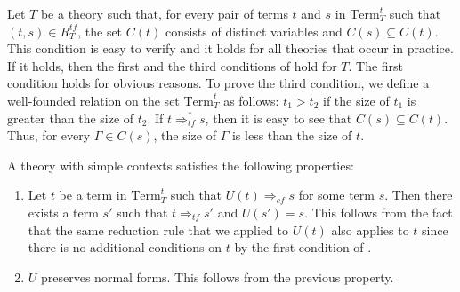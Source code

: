 \documentclass[reqno]{amsart}
\theoremstyle{definition}
\theoremstyle{remark}
\newcommand{\Term}{\mathrm{Term}}
\numberwithin{figure}{section}
\begin{document}
Let $T$ be a theory such that, for every pair of terms $t$ and $s$ in $\Term_T^t$ such that $(t,s) \in R^{tf}_T$, the set $C(t)$ consists of distinct variables and $C(s) \subseteq C(t)$.
This condition is easy to verify and it holds for all theories that occur in practice.
If it holds, then the first and the third conditions of  hold for $T$.
The first condition holds for obvious reasons.
To prove the third condition, we define a well-founded relation on the set $\Term_T^t$ as follows: $t_1 > t_2$ if the size of $t_1$ is greater than the size of $t_2$.
If $t \Rightarrow_{tf}^* s$, then it is easy to see that $C(s) \subseteq C(t)$.
Thus, for every $\Gamma \in C(s)$, the size of $\Gamma$ is less than the size of $t$.

A theory with simple contexts satisfies the following properties:
\begin{enumerate}
\item \label{it:red-fib} Let $t$ be a term in $\Term_T^t$ such that $U(t) \Rightarrow_{cf} s$ for some term $s$.
Then there exists a term $s'$ such that $t \Rightarrow_{tf} s'$ and $U(s') = s$.
This follows from the fact that the same reduction rule that we applied to $U(t)$ also applies to $t$ since there is no additional conditions on $t$ by the first condition of .
\item \label{it:red-nf} $U$ preserves normal forms. This follows from the previous property.
\end{enumerate}
\end{document}
